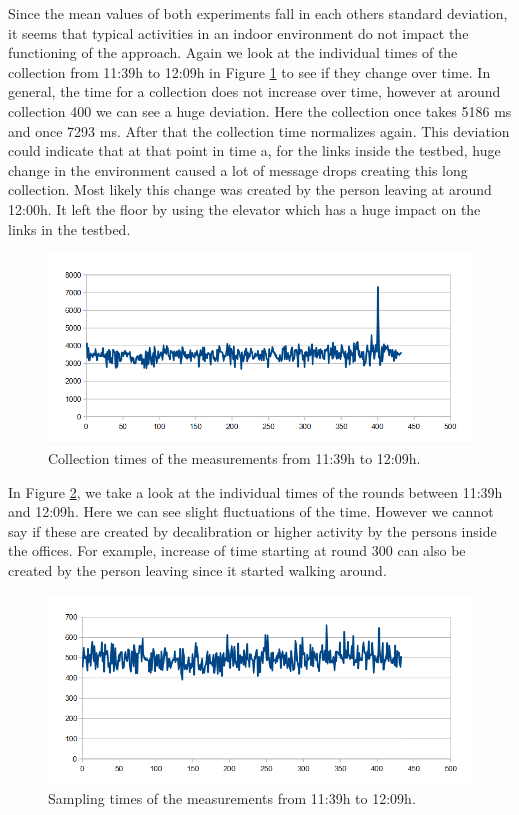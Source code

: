 Since the mean values of both experiments fall in each others standard deviation, it seems that typical activities in an indoor environment do not impact the functioning of the approach. Again we look at the individual times of the collection from 11:39h to 12:09h in Figure \ref{fig:dayC} to see if they change over time. In general, the time for a collection does not increase over time, however at around collection 400 we can see a huge deviation. Here the collection once takes 5186 ms and once 7293 ms. After that the collection time normalizes again. This deviation could indicate that at that point in time a, for the links inside the testbed, huge change in the environment caused a lot of message drops creating this long collection. Most likely this change was created by the person leaving at around 12:00h. It left the floor by using the elevator which has a huge impact on the links in the testbed.


\begin{figure}[htbp]
	\centering         
    \includegraphics[scale=0.5]{content/images/Experiment/DayCollection}
    \caption{Collection times of the measurements from 11:39h to 12:09h.}
	\label{fig:dayC}
\end{figure}

In Figure \ref{fig:DayR}, we take a look at the individual times of the rounds between 11:39h and 12:09h. Here we can see slight fluctuations of the time. However we cannot say if these are created by decalibration or higher activity by the persons inside the offices. For example, increase of time starting at round 300 can also be created by the person leaving since it started walking around.

\begin{figure}[tbp]
	\centering
    \includegraphics[scale=0.5]{content/images/Experiment/DayRounds}
   	\caption{Sampling times of the measurements from 11:39h to 12:09h.}
    \label{fig:DayR}
\end{figure}
    

